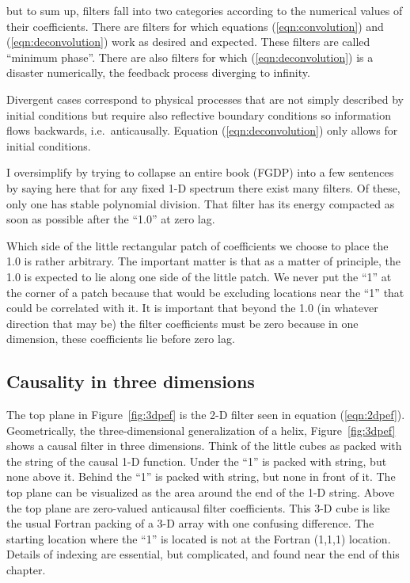 but to sum up, filters fall into two categories according to the
numerical values of their coefficients.
There are filters for which equations
(\ref{eqn:convolution}) and
(\ref{eqn:deconvolution})
work as desired and expected.
These filters are called ``minimum phase''.
There are also filters for which
(\ref{eqn:deconvolution}) is a disaster numerically,
the feedback process diverging to infinity.
\par
Divergent cases correspond to physical processes
that are not simply described by initial conditions
but require also reflective boundary conditions
so information flows backwards, i.e.~anticausally.
Equation (\ref{eqn:deconvolution})
only allows for initial conditions.
\par
I oversimplify by trying to collapse an entire book (FGDP)
into a few sentences by saying here that
for any fixed 1-D spectrum there exist many filters.
Of these, only one has
stable polynomial division.
That filter has its energy compacted
as soon as possible after the ``1.0'' at zero lag.

\par
Which side of the little rectangular patch of coefficients
we choose to place the 1.0 is rather arbitrary.
The important matter is that as a matter of principle,
the 1.0 is expected to lie along one side of the little patch.
We never put the ``1'' at the corner of a patch
because that would be excluding locations near the ``1'' that
could be correlated with it.
It is important that beyond the 1.0 (in whatever direction that may be)
the filter coefficients must be zero because in one dimension,
these coefficients lie before zero lag.


\subsection{Causality in three dimensions}
The top plane in Figure~\ref{fig:3dpef} 
is the 2-D filter seen in equation (\ref{eqn:2dpef}).
Geometrically, the three-dimensional generalization of a helix,
Figure~\ref{fig:3dpef} shows a causal filter in three dimensions.
Think of the little cubes as packed with the string of the causal 1-D function.
Under the ``1'' is packed with string, but none above it.
Behind the ``1'' is packed with string, but none in front of it.
The top plane can be visualized as the area around the end of the 1-D string.
Above the top plane are zero-valued anticausal filter coefficients.
This 3-D cube is like the usual Fortran packing of a 3-D array
with one confusing difference.   The starting location where the ``1''
is located is not at the Fortran (1,1,1) location.
Details of indexing are essential,
but complicated, and found near the end of this chapter.


